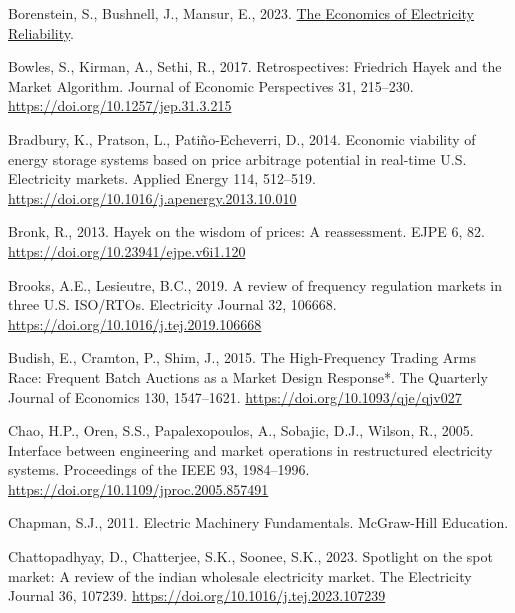 \documentclass[12pt,a4paper,]{report}
\newlength{\cslhangindent}
\newenvironment{CSLReferences}[2] %
 {%
  \setlength{\parindent}{0pt}
  \ifodd #1 \everypar{\setlength{\hangindent}{\cslhangindent}}\ignorespaces\fi
  \ifnum #2 > 0
  \setlength{\parskip}{#2\baselineskip}
  \fi
 }%
 {}
\begin{document}
\begin{CSLReferences}{1}{0}
\leavevmode{}%
Borenstein, S., Bushnell, J., Mansur, E., 2023.
\href{https://haas.berkeley.edu/wp-content/uploads/WP336.pdf}{The
{Economics} of {Electricity Reliability}}.

\leavevmode{}%
Bowles, S., Kirman, A., Sethi, R., 2017. Retrospectives: {Friedrich
Hayek} and the {Market Algorithm}. Journal of Economic Perspectives 31,
215--230. \url{https://doi.org/10.1257/jep.31.3.215}

\leavevmode{}%
Bradbury, K., Pratson, L., Patiño-Echeverri, D., 2014. Economic
viability of energy storage systems based on price arbitrage potential
in real-time {U}.{S}. Electricity markets. Applied Energy 114, 512--519.
\url{https://doi.org/10.1016/j.apenergy.2013.10.010}

\leavevmode{}%
Bronk, R., 2013. Hayek on the wisdom of prices: A reassessment. EJPE 6,
82. \url{https://doi.org/10.23941/ejpe.v6i1.120}

\leavevmode{}%
Brooks, A.E., Lesieutre, B.C., 2019. A review of frequency regulation
markets in three {U}.{S}. {ISO}/{RTOs}. Electricity Journal 32, 106668.
\url{https://doi.org/10.1016/j.tej.2019.106668}

\leavevmode{}%
Budish, E., Cramton, P., Shim, J., 2015. The {High-Frequency Trading
Arms Race}: {Frequent Batch Auctions} as a {Market Design Response}*.
The Quarterly Journal of Economics 130, 1547--1621.
\url{https://doi.org/10.1093/qje/qjv027}

\leavevmode{}%
Chao, H.P., Oren, S.S., Papalexopoulos, A., Sobajic, D.J., Wilson, R.,
2005. Interface between engineering and market operations in
restructured electricity systems. Proceedings of the IEEE 93,
1984--1996. \url{https://doi.org/10.1109/jproc.2005.857491}

\leavevmode{}%
Chapman, S.J., 2011. Electric {Machinery Fundamentals}. {McGraw-Hill
Education}.

\leavevmode{}%
Chattopadhyay, D., Chatterjee, S.K., Soonee, S.K., 2023. Spotlight on
the spot market: {A} review of the indian wholesale electricity market.
The Electricity Journal 36, 107239.
\url{https://doi.org/10.1016/j.tej.2023.107239}


\end{CSLReferences}
\end{document}
